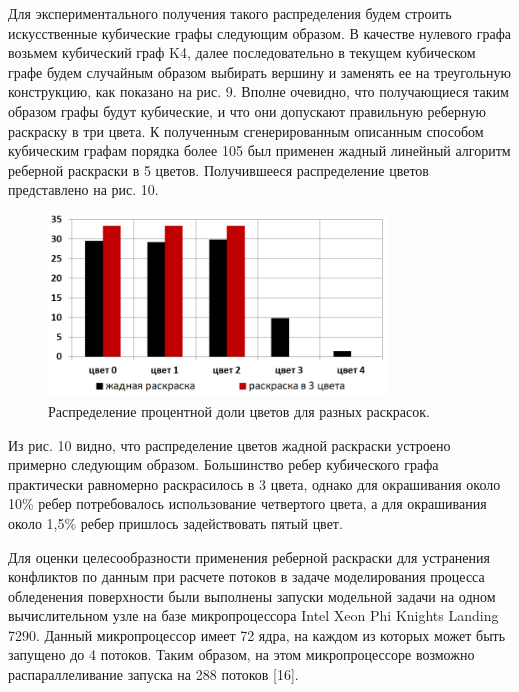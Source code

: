 Для экспериментального получения такого распределения будем строить искусственные кубические графы следующим образом.
В качестве нулевого графа возьмем кубический граф K4, далее последовательно в текущем кубическом графе будем случайным образом выбирать вершину и заменять ее на треугольную конструкцию, как показано на рис. 9.
Вполне очевидно, что получающиеся таким образом графы будут кубические, и что они допускают правильную реберную раскраску в три цвета.
К полученным сгенерированным описанным способом кубическим графам порядка более 105 был применен жадный линейный алгоритм реберной раскраски в 5 цветов.
Получившееся распределение цветов представлено на рис. 10.

\begin{figure}[ht]
\centering
\includegraphics[width=0.8\textwidth]{./pics/text_3_edge_coloring/10-chart.png}
\singlespacing
{}\caption{Распределение процентной доли цветов для разных раскрасок.}
\label{fig:text_3_edge_coloring_10}
\end{figure}

Из рис. 10 видно, что распределение цветов жадной раскраски устроено примерно следующим образом. Большинство ребер кубического графа практически равномерно раскрасилось в 3 цвета, однако для окрашивания около 10\% ребер потребовалось использование четвертого цвета, а для окрашивания около 1,5\% ребер пришлось задействовать пятый цвет.

Для оценки целесообразности применения реберной раскраски для устранения конфликтов по данным при расчете потоков в задаче моделирования процесса обледенения поверхности были выполнены запуски модельной задачи на одном вычислительном узле на базе микропроцессора Intel Xeon Phi Knights Landing 7290.
Данный микропроцессор имеет 72 ядра, на каждом из которых может быть запущено до 4 потоков.
Таким образом, на этом микропроцессоре возможно распараллеливание запуска на 288 потоков [16].

